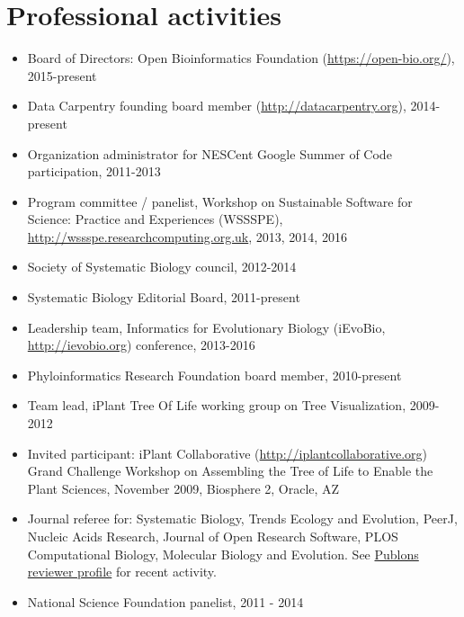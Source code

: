 \documentclass[10pt]{article}
\begin{document}
\section*{Professional activities}
\begin{itemize}
\item{Board of Directors: Open Bioinformatics Foundation (\url{https://open-bio.org/}), 2015-present}
\item{Data Carpentry founding board member (\url{http://datacarpentry.org}), 2014-present}
\item{Organization administrator for NESCent Google Summer of Code participation, 2011-2013}
\item{Program committee / panelist, Workshop on Sustainable Software for Science: Practice and Experiences (WSSSPE), \url{http://wssspe.researchcomputing.org.uk}, 2013, 2014, 2016}
\item{Society of Systematic Biology council, 2012-2014}
\item{Systematic Biology Editorial Board, 2011-present}
\item{Leadership team, Informatics for Evolutionary Biology (iEvoBio, \url{http://ievobio.org}) conference, 2013-2016}
\item{Phyloinformatics Research Foundation board member, 2010-present}
\item{Team lead, iPlant Tree Of Life working group on Tree Visualization, 2009-2012}
\item{Invited participant: iPlant Collaborative (\url{http://iplantcollaborative.org}) Grand Challenge Workshop on Assembling the Tree of Life to Enable the Plant Sciences, November 2009, Biosphere 2, Oracle, AZ}
\item{Journal referee for: Systematic Biology, Trends Ecology and Evolution, PeerJ, Nucleic Acids Research, Journal of Open Research Software, PLOS Computational Biology, Molecular Biology and Evolution}. See \href{https://publons.com/a/213683/}{Publons reviewer profile} for recent activity. 
\item{National Science Foundation panelist, 2011 - 2014}
\end{itemize}
\end{document}
